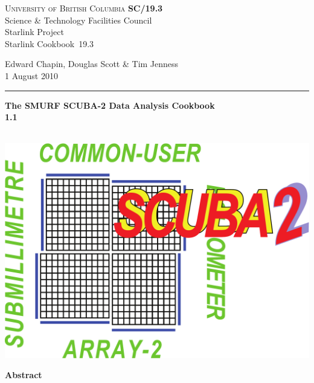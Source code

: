 \documentclass[twoside,11pt]{article}
\newcommand{\stardoccategory}  {Starlink Cookbook}
\newcommand{\stardocinitials}  {SC}
\newcommand{\stardocnumber}    {19.3}
\newcommand{\stardocauthors}   {Edward Chapin, Douglas Scott \& Tim Jenness}
\newcommand{\stardocdate}      {1 August 2010}
\newcommand{\stardoctitle}     {The SMURF SCUBA-2 Data Analysis Cookbook}
\newcommand{\stardocversion}   {1.1}
\newcommand{\stardocmanual}    {\ }
\newcommand{\stardocname}{\stardocinitials /\stardocnumber}
\newenvironment{latexonly}{}{}
\renewcommand{\_}{\texttt{\symbol{95}}}
\begin{document}
\thispagestyle{empty}

\begin{latexonly}
   \textsc{University of British Columbia} \hfill \textbf{\stardocname}\\
   {\large Science \& Technology Facilities Council}\\
   {\large Starlink Project\\}
   {\large \stardoccategory\ \stardocnumber}
   \begin{flushright}
   \stardocauthors\\
   \stardocdate
   \end{flushright}
   \vspace{-4mm}
   \rule{\textwidth}{0.5mm}
   \vspace{5mm}
   \begin{center}
   {\Huge\textbf{\stardoctitle \\ [2.5ex]}}
   {\LARGE\textbf{\stardocversion \\ [4ex]}}
   {\Huge\textbf{\stardocmanual}}
   \end{center}
   \vspace{5mm}

\begin{center}
\hspace{1.3in}\includegraphics[scale=0.3]{sc19_logo}
\end{center}

   \vspace{10mm}
   \begin{center}
      {\Large\textbf{Abstract}}
   \end{center}
\end{latexonly}
\end{document}
